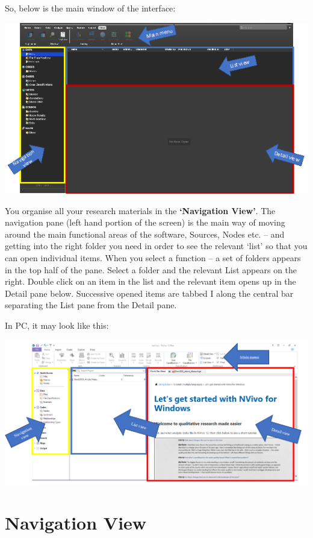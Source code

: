 \documentclass[
]{book}
\begin{document}
So, below is the main window of the interface:

\includegraphics{imgs/interface_mac.png}

You organise all your research materials in the \textbf{`Navigation View'}. The navigation pane (left hand portion of the screen) is the main way of moving around the main functional areas of the software, Sources, Nodes etc. -- and getting into the right folder you need in order to see the relevant `list' so that you can open individual items. When you select a function -- a set of folders appears in the top half of the pane. Select a folder and the relevant List appears on the right. Double click on an item in the list and the relevant item opens up in the Detail pane below. Successive opened items are tabbed I along the central bar separating the List pane from the Detail pane.

In PC, it may look like this:

\includegraphics{imgs/interface_pc.png}

\hypertarget{navigation-view}{%
\section{Navigation View}\label{navigation-view}}
\end{document}
